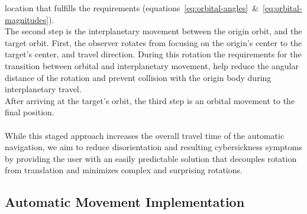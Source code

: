 location that fulfills the requirements (equations~\ref{eq:orbital-angles}~\&~\ref{eq:orbital-magnitudes}).
\\
The second step is the interplanetary movement between the origin orbit, and the target orbit.
First, the observer rotates from focusing on the origin's center to the target's center, and travel direction.
During this rotation the requirements for the transition between orbital and interplanetary movement, help reduce the
angular distance of the rotation and prevent collision with the origin body during interplanetary travel.
\\
After arriving at the target's orbit, the third step is an orbital movement to the final position.
\\
\\
While this staged approach increases the overall travel time of the automatic navigation, we aim to reduce
disorientation and resulting cybersickness symptoms by providing the user with an easily predictable solution that
decouples rotation from translation and minimizes complex and surprising rotations.


\subsection{Automatic Movement Implementation}\label{subsec:automatic-movement-implementation}
